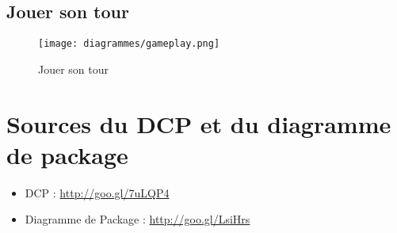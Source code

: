 	\subsection{Jouer son tour}
		\vspace{10mm}
		\begin{figure}[H]
			\centering
			\texttt{[image: diagrammes/gameplay.png]}
			\caption{Jouer son tour}
		\end{figure}
		\vspace{70mm}

\section{Sources du DCP et du diagramme de package}
	\begin{itemize}
		\item DCP : \url{http://goo.gl/7uLQP4}
		\item Diagramme de Package : \url{http://goo.gl/LsiHrs}
	\end{itemize}
